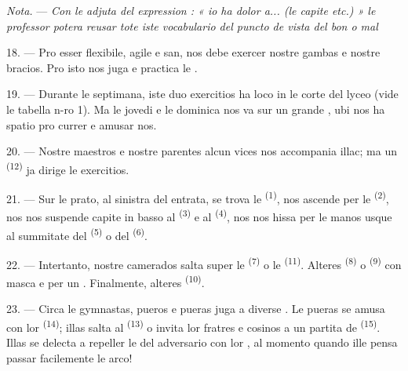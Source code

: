 \textit{Nota.} --- \textit{Con le adjuta del expression : « io ha dolor a... (le
capite etc.) » le professor potera reusar tote iste vocabulario del puncto de
vista del bon o mal} 

\VUsaut{5.0mm}
\VUsaut{2.4mm}
\VUsaut{3.0mm}

18. --- Pro esser flexibile, agile e san, nos debe exercer nostre gambas e
nostre bracios. Pro isto nos juga e practica le .

19. --- Durante le septimana, iste duo exercitios ha loco in le corte del lyceo
(vide le tabella n-ro 1). Ma le jovedi e le dominica nos va sur un grande
, ubi nos ha spatio pro currer e amusar nos.

20. --- Nostre maestros e nostre parentes alcun vices nos accompania illac; ma
un  \textsuperscript{(12)} ja dirige le
exercitios.

21. --- Sur le prato, al sinistra del entrata, se trova le  \textsuperscript{(1)}, nos ascende per le 
\textsuperscript{(2)}, nos nos suspende capite in basso al 
\textsuperscript{(3)} e al  \textsuperscript{(4)}, nos nos
hissa per le manos usque al summitate del 
\textsuperscript{(5)} o del  \textsuperscript{(6)}.

22. --- Intertanto, nostre camerados salta super le 
\textsuperscript{(7)} o le  \textsuperscript{(11)}.
Alteres  \textsuperscript{(8)} o 
\textsuperscript{(9)} con masca e per un . Finalmente,
alteres  \textsuperscript{(10)}.

\VUsaut{4.6mm}
\VUsaut{3.0mm}

23. --- Circa le gymnastas, pueros e pueras juga a diverse . Le
pueras se amusa con lor  \textsuperscript{(14)}; illas salta al
 \textsuperscript{(13)} o invita lor fratres e cosinos a un
partita de  \textsuperscript{(15)}. Illas se delecta a repeller
le  del adversario con lor , al
momento quando ille pensa passar facilemente le arco!

